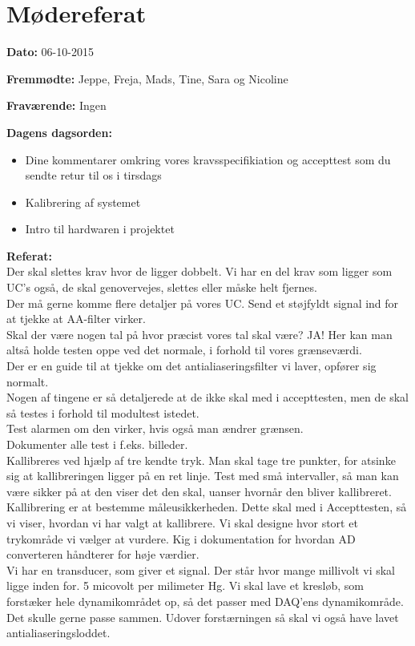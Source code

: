 \chapter{Mødereferat}

\textbf{Dato:} 06-10-2015

\textbf{Fremmødte:} Jeppe, Freja, Mads, Tine, Sara og Nicoline

\textbf{Fraværende:} Ingen

\textbf{Dagens dagsorden:}
\begin{itemize}
	\item Dine kommentarer omkring vores kravsspecifikiation og accepttest som du sendte retur til os i tirsdags
	\item Kalibrering af systemet
    \item Intro til hardwaren i projektet\\
\end{itemize}

\textbf{Referat:}
\\Der skal slettes krav hvor de ligger dobbelt. Vi har en del krav som ligger som UC's også, de skal genovervejes, slettes eller måske helt fjernes. 
\\Der må gerne komme flere detaljer på vores UC. Send et støjfyldt signal ind for at tjekke at AA-filter virker. 
\\Skal der være nogen tal på hvor præcist vores tal skal være? JA! Her kan man altså holde testen oppe ved det normale, i forhold til vores grænseværdi. 
\\Der er en guide til at tjekke om det antialiaseringsfilter vi laver, opfører sig normalt. 
\\Nogen af tingene er så detaljerede at de ikke skal med i accepttesten, men de skal så testes i forhold til modultest istedet. 
\\Test alarmen om den virker, hvis også man ændrer grænsen. 
\\Dokumenter alle test i f.eks. billeder. 
\\Kallibreres ved hjælp af tre kendte tryk. Man skal tage tre punkter, for atsinke sig at kallibreringen ligger på en ret linje. Test med små intervaller, så man kan være sikker på at den viser det den skal, uanser hvornår den bliver kallibreret. Kallibrering er at bestemme måleusikkerheden. Dette skal med i Accepttesten, så vi viser, hvordan vi har valgt at kallibrere. Vi skal designe hvor stort et trykområde vi vælger at vurdere. Kig i dokumentation for hvordan AD converteren håndterer for høje værdier. 
\\Vi har en transducer, som giver et signal. Der står hvor mange millivolt vi skal ligge inden for. 5 micovolt per milimeter Hg. Vi skal lave et kresløb, som forstæker hele dynamikområdet op, så det passer med DAQ'ens dynamikområde. Det skulle gerne passe sammen. Udover forstærningen så skal vi også have lavet antialiaseringsloddet.